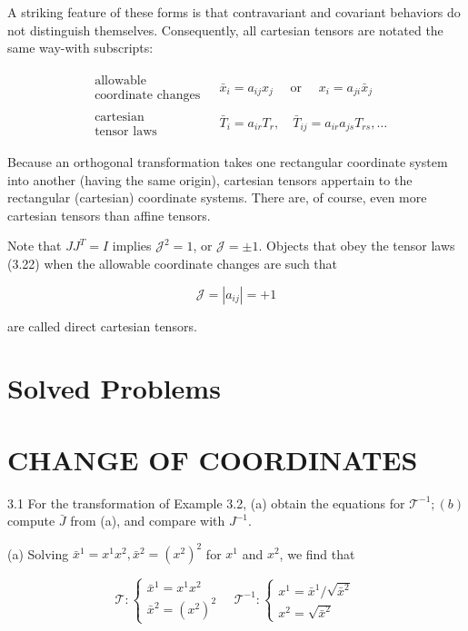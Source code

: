 \documentclass[10pt]{article}
\begin{document}
A striking feature of these forms is that contravariant and covariant behaviors do not distinguish themselves. Consequently, all cartesian tensors are notated the same way-with subscripts:


\begin{align*}
\begin{array}{r}
\text { allowable } \\
\text { coordinate changes }
\end{array} & \bar{x}_{i}=a_{i j} x_{j} \quad \text { or } \quad x_{i}=a_{j i} \bar{x}_{j} \\
\begin{array}{r}
\text { cartesian } \\
\text { tensor laws }
\end{array} & \bar{T}_{i}=a_{i r} T_{r}, \quad \bar{T}_{i j}=a_{i r} a_{j s} T_{r s}, \ldots \tag{3.22}
\end{align*}


Because an orthogonal transformation takes one rectangular coordinate system into another (having the same origin), cartesian tensors appertain to the rectangular (cartesian) coordinate systems. There are, of course, even more cartesian tensors than affine tensors.

Note that $J J^{T}=I$ implies $\mathscr{J}^{2}=1$, or $\mathscr{J}= \pm 1$. Objects that obey the tensor laws (3.22) when the allowable coordinate changes are such that

$$
\mathscr{J}=\left|a_{i j}\right|=+1
$$

are called direct cartesian tensors.

\section*{Solved Problems}
\section*{CHANGE OF COORDINATES}
3.1 For the transformation of Example 3.2, (a) obtain the equations for $\mathscr{T}^{-1} ;(b)$ compute $\bar{J}$ from (a), and compare with $J^{-1}$.

(a) Solving $\bar{x}^{1}=x^{1} x^{2}, \bar{x}^{2}=\left(x^{2}\right)^{2}$ for $x^{1}$ and $x^{2}$, we find that

\[
\mathscr{T}:\left\{\begin{array}{l}
\bar{x}^{1}=x^{1} x^{2}  \tag{1}\\
\bar{x}^{2}=\left(x^{2}\right)^{2}
\end{array} \quad \mathscr{T}^{-1}:\left\{\begin{array}{l}
x^{1}=\bar{x}^{1} / \sqrt{\bar{x}^{2}} \\
x^{2}=\sqrt{\bar{x}^{2}}
\end{array}\right.\right.
\]
\end{document}
